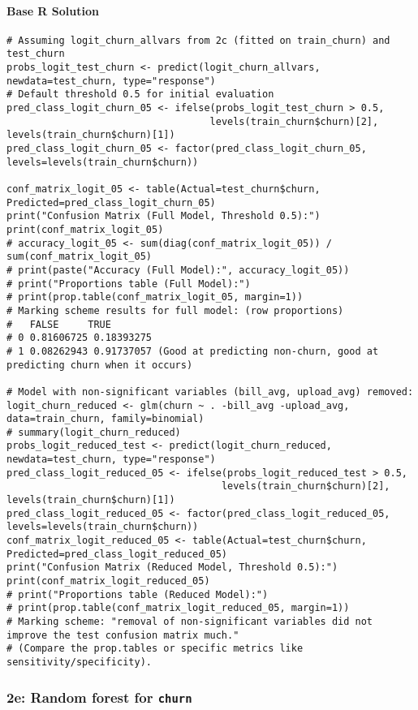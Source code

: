 \documentclass[12pt,a4paper]{article}
\newcommand{\Rcode}[1]{\texttt{#1}} %
\begin{document}
        \paragraph{Base R Solution}
\begin{lstlisting}
# Assuming logit_churn_allvars from 2c (fitted on train_churn) and test_churn
probs_logit_test_churn <- predict(logit_churn_allvars, newdata=test_churn, type="response")
# Default threshold 0.5 for initial evaluation
pred_class_logit_churn_05 <- ifelse(probs_logit_test_churn > 0.5, 
                                   levels(train_churn$churn)[2], levels(train_churn$churn)[1])
pred_class_logit_churn_05 <- factor(pred_class_logit_churn_05, levels=levels(train_churn$churn))

conf_matrix_logit_05 <- table(Actual=test_churn$churn, Predicted=pred_class_logit_churn_05)
print("Confusion Matrix (Full Model, Threshold 0.5):")
print(conf_matrix_logit_05)
# accuracy_logit_05 <- sum(diag(conf_matrix_logit_05)) / sum(conf_matrix_logit_05)
# print(paste("Accuracy (Full Model):", accuracy_logit_05))
# print("Proportions table (Full Model):")
# print(prop.table(conf_matrix_logit_05, margin=1)) 
# Marking scheme results for full model: (row proportions)
#   FALSE     TRUE
# 0 0.81606725 0.18393275
# 1 0.08262943 0.91737057 (Good at predicting non-churn, good at predicting churn when it occurs)

# Model with non-significant variables (bill_avg, upload_avg) removed:
logit_churn_reduced <- glm(churn ~ . -bill_avg -upload_avg, data=train_churn, family=binomial)
# summary(logit_churn_reduced)
probs_logit_reduced_test <- predict(logit_churn_reduced, newdata=test_churn, type="response")
pred_class_logit_reduced_05 <- ifelse(probs_logit_reduced_test > 0.5,
                                     levels(train_churn$churn)[2], levels(train_churn$churn)[1])
pred_class_logit_reduced_05 <- factor(pred_class_logit_reduced_05, levels=levels(train_churn$churn))
conf_matrix_logit_reduced_05 <- table(Actual=test_churn$churn, Predicted=pred_class_logit_reduced_05)
print("Confusion Matrix (Reduced Model, Threshold 0.5):")
print(conf_matrix_logit_reduced_05)
# print("Proportions table (Reduced Model):")
# print(prop.table(conf_matrix_logit_reduced_05, margin=1))
# Marking scheme: "removal of non-significant variables did not improve the test confusion matrix much."
# (Compare the prop.tables or specific metrics like sensitivity/specificity).
\end{lstlisting}

    \subsubsection{2e: Random forest for \Rcode{churn}}
\end{document}
